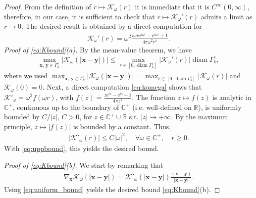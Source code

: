 \documentclass[]{article}
\numberwithin{equation}{section}
\numberwithin{theorem}{section}
\numberwithin{lemma}{section}
\numberwithin{corollary}{section}
\numberwithin{proposition}{section}
\numberwithin{definition}{section}
\newcommand{\mypar}[1]{\noindent\textit{#1}\hspace{0.1em}}
\newcommand{\re}{\varepsilon}
\renewcommand{\vec}{\boldsymbol}
\begin{document}
	\begin{proof}
		From the definition of $r\mapsto\mathcal{K}_{\omega}(r)$ it is immediate that it is $C^{\infty}(0, \infty)$, therefore, in our case, it is sufficient to check that $r\mapsto \mathcal{K}_{\omega}'(r)$ admits a limit as $r\rightarrow 0$. The desired result is obtained by a direct computation for
		\begin{align}
			\label{eq:komega}
			\mathcal{K}_{\omega}'(r)=\omega^2\frac{i\omega r \mathrm{e}^{i\omega r}-\mathrm{e}^{i\omega r}+1}{4\pi \omega^2 r^2}.
		\end{align}
		\mypar{Proof of \eqref{eq:Kbound}(a).} 
		By the mean-value theorem, we have 
		\begin{align}
			\label{eq:uppbound}
			\max_{\vec{x}, \, \vec{y}\in \Gamma^{\re}_k}|\mathcal{K}_{\omega}(|\vec{x}-\vec{y}|)|\leq \max_{r\in [0, \operatorname{diam}\Gamma_k^{\re}]}|\mathcal{K}_{\omega}'(r)|\operatorname{diam}\Gamma_k^{\re},
		\end{align}
		where we used $
		\max_{\vec{x}, \, \vec{y}\in \Gamma^{\re}_k}|\mathcal{K}_{\omega}(|\vec{x}-\vec{y}|)|=\max_{r\in [0, \operatorname{diam}\Gamma_k^{\re}]}|\mathcal{K}_{\omega}(r)|$ and  $\mathcal{K}_{\omega}(0)=0$.
		Next, a direct computation \eqref{eq:komega} shows that $\mathcal{K}'_{\omega}=\omega^2 f(\omega r)$,  
		with $f(z)=\frac{z\mathrm{e}^{iz}-\mathrm{e}^{iz}+1}{4\pi z^2}$. The function $z\mapsto f(z)$ is analytic in $\mathbb{C}^+$,  continuous up to the boundary of $\mathbb{C}^+$ (i.e. well-defined on $\mathbb{R}$), is uniformly bounded by $C/|z|$, $C>0$, for $z\in \mathbb{C}^+\cup\mathbb{R}$ s.t. $|z|\rightarrow+\infty$. By the maximum principle, $z\mapsto|f(z)|$ is bounded by a constant. 	Thus, 
		\begin{align}
			\label{eq:uniform_bound}
			|\mathcal{K}'_{\omega}(r)|\leq C|\omega|^2, \quad \forall \omega\in \mathbb{C}^+, \quad  r\geq 0.
		\end{align}
		With \eqref{eq:uppbound}, this yields the desired bound.
		
		\mypar{Proof of \eqref{eq:Kbound}(b).}	
		We start by remarking that 
		\begin{align}
			\label{eq:grad_K}
			\nabla_{\vec{x}}\mathcal{K}_{\omega}(|\vec{x}-\vec{y}|)=\mathcal{K}'_{\omega}(|\vec{x}-\vec{y}|)\frac{(\vec{x}-\vec{y})}{|\vec{x}-\vec{y}|}.
		\end{align}
		Using \eqref{eq:uniform_bound} yields the desired bound \eqref{eq:Kbound}(b). 
		
	\end{proof}
\end{document}
